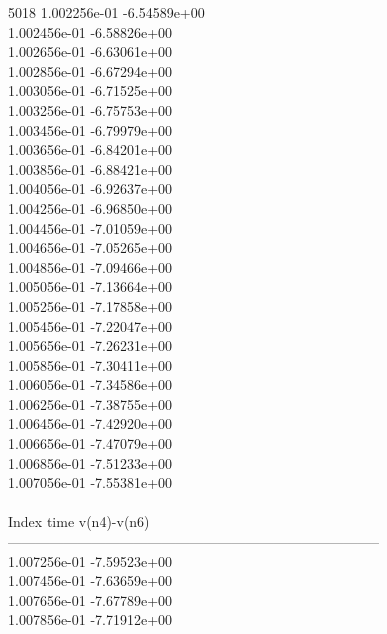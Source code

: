 5018	1.002256e-01	-6.54589e+00	\\ 	1.002456e-01	-6.58826e+00	\\ 	1.002656e-01	-6.63061e+00	\\ 	1.002856e-01	-6.67294e+00	\\ 	1.003056e-01	-6.71525e+00	\\ 	1.003256e-01	-6.75753e+00	\\ 	1.003456e-01	-6.79979e+00	\\ 	1.003656e-01	-6.84201e+00	\\ 	1.003856e-01	-6.88421e+00	\\ 	1.004056e-01	-6.92637e+00	\\ 	1.004256e-01	-6.96850e+00	\\ 	1.004456e-01	-7.01059e+00	\\ 	1.004656e-01	-7.05265e+00	\\ 	1.004856e-01	-7.09466e+00	\\ 	1.005056e-01	-7.13664e+00	\\ 	1.005256e-01	-7.17858e+00	\\ 	1.005456e-01	-7.22047e+00	\\ 	1.005656e-01	-7.26231e+00	\\ 	1.005856e-01	-7.30411e+00	\\ 	1.006056e-01	-7.34586e+00	\\ 	1.006256e-01	-7.38755e+00	\\ 	1.006456e-01	-7.42920e+00	\\ 	1.006656e-01	-7.47079e+00	\\ 	1.006856e-01	-7.51233e+00	\\ 	1.007056e-01	-7.55381e+00	\\ \hline
\\ \hline
Index   time            v(n4)-v(n6)     \\ \hline
--------------------------------------------------------------------------------\\ 	1.007256e-01	-7.59523e+00	\\ 	1.007456e-01	-7.63659e+00	\\ 	1.007656e-01	-7.67789e+00	\\ 	1.007856e-01	-7.71912e+00	\\ \hline
